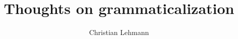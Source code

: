 \title{Thoughts on grammaticalization}
\subtitle{}
\BackBody{}
\dedication{}
\typesetter{}
\proofreader{}
\author{Christian Lehmann}
\newlength{\csspine} 
\newlength{\bodspine}
\setlength{\csspine}{27.0559784mm} %
\setlength{\bodspine}{40mm} %
\renewcommand{\lsISBN}{}                     
\renewcommand{\lsSeries}{tbls} %
\renewcommand{\lsSeriesNumber}{1} %
\renewcommand{\lsURL}{http://langsci-press.org/catalog/book/-1} %